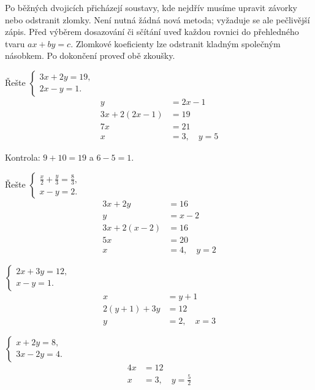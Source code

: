 \documentclass[11pt,a4paper]{article}
\begin{document}
Po běžných dvojicích přicházejí soustavy, kde nejdřív musíme upravit závorky nebo odstranit zlomky. Není nutná žádná nová metoda; vyžaduje se ale pečlivější zápis.
Před výběrem dosazování či sčítání uveď každou rovnici do přehledného tvaru $ax+by=c$. Zlomkové koeficienty lze odstranit kladným společným násobkem. Po dokončení proveď obě zkoušky.
\begin{prikladReseniBox}[title={Příklad 1}]
Řešte $\begin{cases}3x+2y=19,\\2x-y=1.\end{cases}$
\tcblower
\begin{align*}
y&=2x-1 \\
 3x+2(2x-1)&=19 \\
 7x&=21 \\
 x&=3,\quad y=5
\end{align*}

Kontrola: $9+10=19$ a $6-5=1$.
\end{prikladReseniBox}
\begin{prikladReseniBox}[title={Příklad 2}]
Řešte $\begin{cases}\frac{x}{2}+\frac y3=\frac83,\\x-y=2.\end{cases}$
\tcblower
\begin{align*}
3x+2y&=16 \\
 y&=x-2 \\
 3x+2(x-2)&=16 \\
 5x&=20 \\
 x&=4,\quad y=2
\end{align*}
\end{prikladReseniBox}
\begin{zadaniReseniBox}[title={Úloha 1}]
$\begin{cases}2x+3y=12,\\x-y=1.\end{cases}$
\tcblower
\begin{align*}
x&=y+1 \\
 2(y+1)+3y&=12 \\
 y&=2,\quad x=3
\end{align*}
\end{zadaniReseniBox}
\begin{zadaniReseniBox}[title={Úloha 2}]
$\begin{cases}x+2y=8,\\3x-2y=4.\end{cases}$
\tcblower
\begin{align*}
4x&=12 \\
 x&=3,\quad y=\frac52
\end{align*}
\end{zadaniReseniBox}
\end{document}
